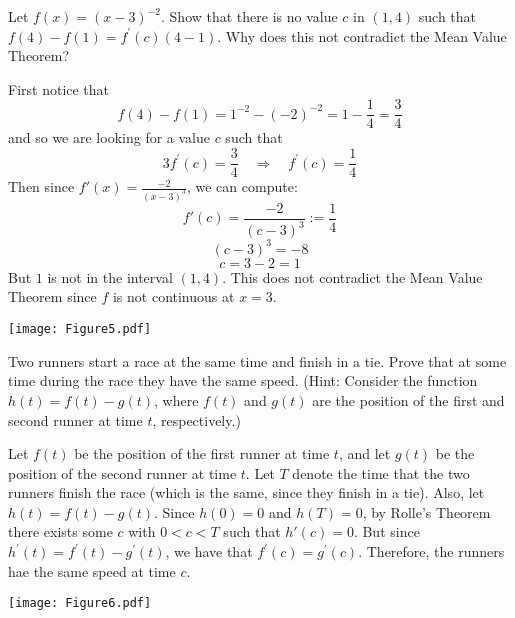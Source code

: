 \documentclass[nooutcomes]{ximera}
\begin{document}
\begin{problem}
Let $f(x) = (x-3)^{-2}$.  Show that there is no value $c$ in $(1,4)$ such that $f(4) - f(1) = f^{\prime}(c) (4-1)$.  Why does this not contradict the Mean Value Theorem?
		\begin{freeResponse}
		First notice that 
		$$f(4)-f(1) = 1^{-2} - (-2)^{-2} = 1-\frac{1}{4} = \frac{3}{4}$$
		and so we are looking for a value $c$ such that 
		$$3 f^\prime (c) = \frac{3}{4} \quad \Longrightarrow \quad f^\prime (c) = \frac{1}{4} $$
		Then since $f'(x) = \frac{-2}{(x-3)^3}$, we can compute:
		$$ f'(c) = \frac{-2}{(c-3)^3} := \frac{1}{4}$$
		$$ (c-3)^3 = - 8 $$
		$$ c = 3 - 2 = 1 $$
		But $1$ is not in the interval $(1,4)$.  This does not contradict the Mean Value Theorem since $f$ is not continuous at $x=3$.
		
		\begin{image}
		\texttt{[image: Figure5.pdf]}
		\end{image}
		
		\end{freeResponse}
			
			
		
\end{problem}















\begin{problem}
Two runners start a race at the same time and finish in a tie.  Prove that at some time during the race they have the same speed.  (Hint:  Consider the function $h(t)=f(t)-g(t)$, where $f(t)$ and $g(t)$ are the position of the first and second runner at time $t$, respectively.)
		\begin{freeResponse}
		Let $f(t)$ be the position of the first runner at time $t$, and let $g(t)$ be the position of the second runner at time $t$.  Let $T$ denote the time that the two runners finish the race (which is the same, since they finish in a tie).  Also, let $h(t) = f(t) - g(t)$.  Since $h(0) = 0$ and $h(T) = 0$, by Rolle's Theorem there exists some $c$ with $0 < c < T$ such that $h'(c)=0$.  But since $h^\prime (t) = f^\prime (t) - g^\prime (t)$, we have that $f^\prime (c) = g^\prime (c)$.  Therefore, the runners hae the same speed at time $c$.  
		
		\begin{image}
		\texttt{[image: Figure6.pdf]}
		\end{image}
		
		\end{freeResponse}
			
			
	
\end{problem}






	
	
	
	
	
	
	
	
	

	










								
				
				
	
\end{document}
